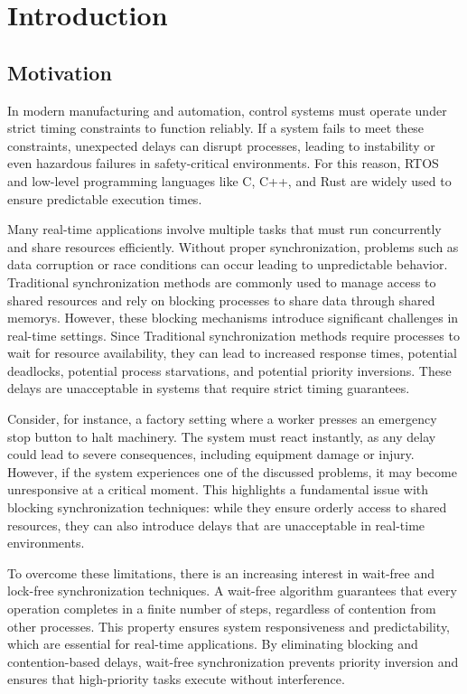 \chapter{Introduction}\label{ch:introduction}

\section{Motivation}\label{sec:motivation}

In modern manufacturing and automation, control systems must operate under strict timing constraints to function reliably. If a system fails to meet these constraints, unexpected delays can disrupt processes, leading to instability or even hazardous failures in safety-critical environments. For this reason, \ac{RTOS} and low-level programming languages like C, C++, and Rust are widely used to ensure predictable execution times.

Many real-time applications involve multiple tasks that must run concurrently and share resources efficiently. Without proper synchronization, problems such as data corruption or race conditions can occur leading to unpredictable behavior. Traditional synchronization methods are commonly used to manage access to shared resources and rely on blocking processes to share data through shared memorys. However, these blocking mechanisms introduce significant challenges in real-time settings. Since Traditional synchronization methods require processes to wait for resource availability, they can lead to increased response times, potential deadlocks, potential process starvations, and potential priority inversions. These delays are unacceptable in systems that require strict timing guarantees. \cite{herlihy1991wait, brandenburg2019multiprocessorrealtimelockingprotocols, kode2024analysisSynchronization}

Consider, for instance, a factory setting where a worker presses an emergency stop button to halt machinery. The system must react instantly, as any delay could lead to severe consequences, including equipment damage or injury. However, if the system experiences one of the discussed problems, it may become unresponsive at a critical moment. This highlights a fundamental issue with blocking synchronization techniques: while they ensure orderly access to shared resources, they can also introduce delays that are unacceptable in real-time environments.

To overcome these limitations, there is an increasing interest in wait-free and lock-free synchronization techniques. A wait-free algorithm guarantees that every operation completes in a finite number of steps, regardless of contention from other processes. This property ensures system responsiveness and predictability, which are essential for real-time applications. By eliminating blocking and contention-based delays, wait-free synchronization prevents priority inversion and ensures that high-priority tasks execute without interference. \cite{kogan2012methodology, herlihy1991wait, brandenburg2019multiprocessorrealtimelockingprotocols}

